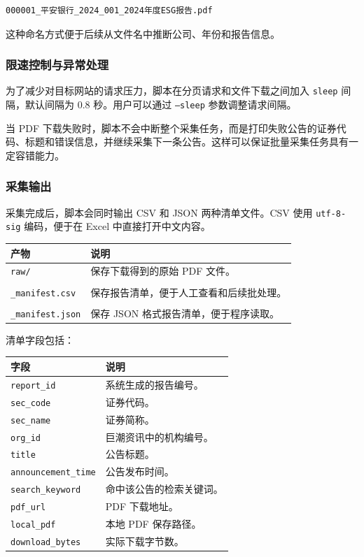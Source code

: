 \documentclass[UTF8,a4paper,12pt]{ctexart}
\newenvironment{manualtable}[1]{%
  \small
  \begin{longtable}{#1}
}{%
  \end{longtable}
  \normalsize
}
\begin{document}
\begin{lstlisting}
000001_平安银行_2024_001_2024年度ESG报告.pdf
\end{lstlisting}

这种命名方式便于后续从文件名中推断公司、年份和报告信息。

\subsubsection{限速控制与异常处理}

为了减少对目标网站的请求压力，脚本在分页请求和文件下载之间加入 \texttt{sleep} 间隔，默认间隔为 0.8 秒。用户可以通过 \texttt{--sleep} 参数调整请求间隔。

当 PDF 下载失败时，脚本不会中断整个采集任务，而是打印失败公告的证券代码、标题和错误信息，并继续采集下一条公告。这样可以保证批量采集任务具有一定容错能力。

\subsubsection{采集输出}

采集完成后，脚本会同时输出 CSV 和 JSON 两种清单文件。CSV 使用 \texttt{utf-8-sig} 编码，便于在 Excel 中直接打开中文内容。

\begin{manualtable}{p{5cm}p{9cm}}
\toprule
\textbf{产物} & \textbf{说明} \\
\midrule
\endhead
\texttt{raw/} & 保存下载得到的原始 PDF 文件。 \\
\makecell[l]{\texttt{a\_share\_esg\_reports}\\\texttt{\_manifest.csv}} & 保存报告清单，便于人工查看和后续批处理。 \\
\makecell[l]{\texttt{a\_share\_esg\_reports}\\\texttt{\_manifest.json}} & 保存 JSON 格式报告清单，便于程序读取。 \\
\bottomrule
\end{manualtable}

清单字段包括：

\begin{manualtable}{p{4cm}p{10cm}}
\toprule
\textbf{字段} & \textbf{说明} \\
\midrule
\endhead
\texttt{report\_id} & 系统生成的报告编号。 \\
\texttt{sec\_code} & 证券代码。 \\
\texttt{sec\_name} & 证券简称。 \\
\texttt{org\_id} & 巨潮资讯中的机构编号。 \\
\texttt{title} & 公告标题。 \\
\texttt{announcement\_time} & 公告发布时间。 \\
\texttt{search\_keyword} & 命中该公告的检索关键词。 \\
\texttt{pdf\_url} & PDF 下载地址。 \\
\texttt{local\_pdf} & 本地 PDF 保存路径。 \\
\texttt{download\_bytes} & 实际下载字节数。 \\
\bottomrule
\end{manualtable}
\end{document}
